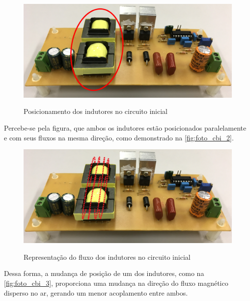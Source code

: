     \begin{figure}[H]
    	\centering
    	\caption{Posicionamento dos indutores no circuito inicial}
    	\includegraphics[scale=.1]{pdf/fotos/placa_vista_lateral_sel.jpg}
        \label{fig:foto_cbi_1}
    \end{figure}
    
    Percebe-se pela figura, que ambos os indutores estão posicionados paralelamente e com seus fluxos na mesma direção, como demonstrado na \autoref{fig:foto_cbi_2}.
    
    \begin{figure}[H]
    	\centering
    	\caption{Representação do fluxo dos indutores no circuito inicial}
    	\includegraphics[scale=.1]{pdf/fotos/placa_vista_lateral_fluxo.jpg}
        \label{fig:foto_cbi_2}
    \end{figure}
    
    Dessa forma, a mudança de posição de um dos indutores, como na \autoref{fig:foto_cbi_3}, proporciona uma mudança na direção do fluxo magnético disperso no ar, gerando um menor acoplamento entre ambos. 
    
